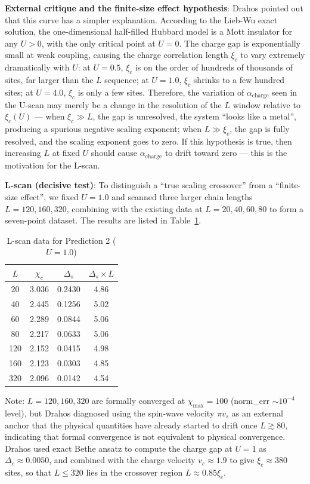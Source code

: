 \documentclass[prb,reprint,twocolumn,superscriptaddress]{revtex4-2}
\begin{document}
\textbf{External critique and the finite-size effect hypothesis}: Drahos pointed out that this curve has a simpler explanation. According to the Lieb-Wu exact solution, the one-dimensional half-filled Hubbard model is a Mott insulator for any $U > 0$, with the only critical point at $U = 0$. The charge gap is exponentially small at weak coupling, causing the charge correlation length $\xi_c$ to vary extremely dramatically with $U$: at $U = 0.5$, $\xi_c$ is on the order of hundreds of thousands of sites, far larger than the $L$ sequence; at $U = 1.0$, $\xi_c$ shrinks to a few hundred sites; at $U = 4.0$, $\xi_c$ is only a few sites. Therefore, the variation of $\alpha_{\mathrm{charge}}$ seen in the U-scan may merely be a change in the resolution of the $L$ window relative to $\xi_c(U)$ --- when $\xi_c \gg L$, the gap is unresolved, the system ``looks like a metal'', producing a spurious negative scaling exponent; when $L \gg \xi_c$, the gap is fully resolved, and the scaling exponent goes to zero. If this hypothesis is true, then increasing $L$ at fixed $U$ should cause $\alpha_{\mathrm{charge}}$ to drift toward zero --- this is the motivation for the L-scan.

\textbf{L-scan (decisive test)}: To distinguish a ``true scaling crossover'' from a ``finite-size effect'', we fixed $U = 1.0$ and scanned three larger chain lengths $L = 120, 160, 320$, combining with the existing data at $L = 20, 40, 60, 80$ to form a seven-point dataset. The results are listed in Table~\ref{tab:L_scan}.

\begin{table}[htbp]
\caption{L-scan data for Prediction 2 ($U = 1.0$)}
\label{tab:L_scan}
\begin{tabular}{cccc}
\toprule
$L$ & $\chi_c$ & $\Delta_s$ & $\Delta_s \times L$ \\
\midrule
20 & 3.036 & 0.2430 & 4.86 \\
40 & 2.445 & 0.1256 & 5.02 \\
60 & 2.289 & 0.0844 & 5.06 \\
80 & 2.217 & 0.0633 & 5.06 \\
120 & 2.152 & 0.0415 & 4.98 \\
160 & 2.123 & 0.0303 & 4.85 \\
320 & 2.096 & 0.0142 & 4.54 \\
\bottomrule
\end{tabular}
\par
\smallskip
\small Note: $L = 120, 160, 320$ are formally converged at $\chi_{\max} = 100$ (norm\_err $\sim 10^{-4}$ level), but Drahos diagnosed using the spin-wave velocity $\pi v_s$ as an external anchor that the physical quantities have already started to drift once $L \gtrsim 80$, indicating that formal convergence is not equivalent to physical convergence. Drahos used exact Bethe ansatz to compute the charge gap at $U=1$ as $\Delta_c \approx 0.0050$, and combined with the charge velocity $v_c \approx 1.9$ to give $\xi_c \approx 380$ sites, so that $L \leq 320$ lies in the crossover region $L \approx 0.85\xi_c$.
\end{table}
\end{document}
